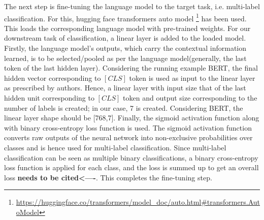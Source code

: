The next step is fine-tuning the language model to the target task, i.e. multi-label classification. For this, hugging face transformers auto model \footnote{\url{https://huggingface.co/transformers/model_doc/auto.html#transformers.AutoModel}} has been used. This loads the corresponding language model with pre-trained weights. For our downstream task of classification, a linear layer is added to the loaded model. Firstly, the language model's outputs, which carry the contextual information learned, is to be selected/pooled as per the language model(generally, the last token of the last hidden layer). Considering the running example BERT, the final hidden vector corresponding to $[CLS]$ token is used as input to the linear layer as prescribed by authors\cite{devlin2018bert}. Hence, a linear layer with input size that of the last hidden unit corresponding to $[CLS]$ token and output size corresponding to the number of labels is created; in our case, 7 is created. Considering BERT, the linear layer shape should be [768,7].  Finally, the sigmoid activation function along with binary cross-entropy loss function is used. The sigmoid activation function converts raw outputs of the neural network into non-exclusive probabilities over classes and is hence used for multi-label classification. Since multi-label classification can be seen as multiple binary classifications, a binary cross-entropy loss function is applied for each class, and the loss is summed up to get an overall loss \textbf{needs to be cited<----}. This completes the fine-tuning step.

